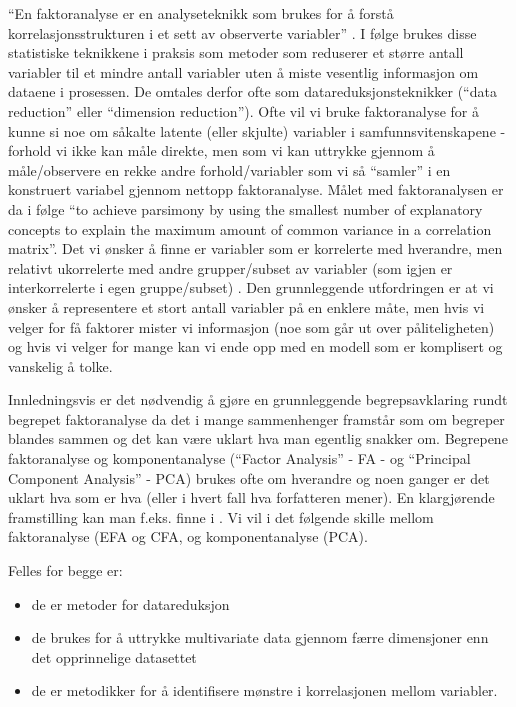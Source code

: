 \documentclass[
]{article}
\providecommand{\tightlist}{%
  \setlength{\itemsep}{0pt}\setlength{\parskip}{0pt}}
\begin{document}
``En faktoranalyse er en analyseteknikk som brukes for å forstå korrelasjonsstrukturen i et sett av observerte variabler'' \citep[s.221]{bjerkanFaktoranalyse2007b}. I følge \citet{mehmetogluInnforingStatistiskeDataanalyser2020} brukes disse statistiske teknikkene i praksis som metoder som reduserer et større antall variabler til et mindre antall variabler uten å miste vesentlig informasjon om dataene i prosessen. De omtales derfor ofte som datareduksjonsteknikker (``data reduction'' eller ``dimension reduction''). Ofte vil vi bruke faktoranalyse for å kunne si noe om såkalte latente (eller skjulte) variabler i samfunnsvitenskapene - forhold vi ikke kan måle direkte, men som vi kan uttrykke gjennom å måle/observere en rekke andre forhold/variabler som vi så ``samler'' i en konstruert variabel gjennom nettopp faktoranalyse. Målet med faktoranalysen er da i følge \citet{tinsleyUsesFactorAnalysis1987} ``to achieve parsimony by using the smallest number of explanatory concepts to explain the maximum amount of common variance in a correlation matrix''. Det vi ønsker å finne er variabler som er korrelerte med hverandre, men relativt ukorrelerte med andre grupper/subset av variabler (som igjen er interkorrelerte i egen gruppe/subset) \citep{tabachnikUsingMultivariateStatistics2007}. Den grunnleggende utfordringen er at vi ønsker å representere et stort antall variabler på en enklere måte, men hvis vi velger for få faktorer mister vi informasjon (noe som går ut over påliteligheten) og hvis vi velger for mange kan vi ende opp med en modell som er komplisert og vanskelig å tolke.

Innledningsvis er det nødvendig å gjøre en grunnleggende begrepsavklaring rundt begrepet faktoranalyse da det i mange sammenhenger framstår som om begreper blandes sammen og det kan være uklart hva man egentlig snakker om. Begrepene faktoranalyse og komponentanalyse (``Factor Analysis'' - FA - og ``Principal Component Analysis'' - PCA) brukes ofte om hverandre og noen ganger er det uklart hva som er hva (eller i hvert fall hva forfatteren mener). En klargjørende framstilling kan man f.eks. finne i \citet{joreskogkarlg.MultivariateAnalysisLISREL2016}. Vi vil i det følgende skille mellom faktoranalyse (EFA og CFA, og komponentanalyse (PCA).

Felles for begge er:

\begin{itemize}
\tightlist
\item
  de er metoder for datareduksjon
\item
  de brukes for å uttrykke multivariate data gjennom færre dimensjoner enn det opprinnelige datasettet
\item
  de er metodikker for å identifisere mønstre i korrelasjonen mellom variabler.
\end{itemize}
\end{document}
